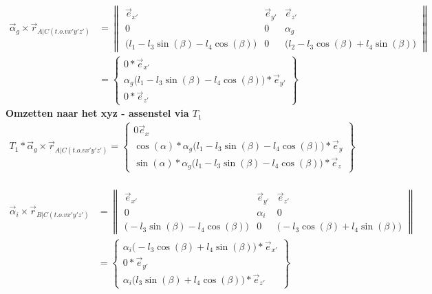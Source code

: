 \documentclass[a4paper,10pt]{article}
\begin{document}
\begin{equation}
	\begin{aligned}
		\vec{\alpha}_g \times \vec{r}_{A|C(t.o.v x'y'z')}  &=  \begin{Vmatrix}
			\vec{e}_{x'}& \vec{e}_{y'} & \vec{e}_{z'}\\
			0 & 0 & \alpha_g \\		
			\Big(l_1 - l_3 \sin(\beta) - l_4 \cos(\beta)\Big) &
			0 & \Big (l_2 - l_3 \cos(\beta) + l_4 \sin(\beta) \Big) 
		\end{Vmatrix}\\
		&= \begin{Bmatrix}
			0*\vec{e}_{x'}\\
			\alpha_g \Big(l_1 - l_3 \sin(\beta) - l_4 \cos(\beta)\Big)*\vec{e}_{y'}\\
			0*\vec{e}_{z'}
		\end{Bmatrix}
	\end{aligned}
\end{equation}
\textbf{Omzetten naar het xyz - assenstel via $T_1$}
\begin{equation}
	\begin{aligned}
		{T}_{1}*\vec{\alpha}_g \times \vec{r}_{A|C(t.o.v x'y'z')} = \begin{Bmatrix}
			{0\vec{e}_{x}}\\
			\cos(\alpha)*	\alpha_g \Big(l_1 - l_3 \sin(\beta) - l_4 \cos(\beta)\Big)*\vec{e}_{y}\\
			\sin(\alpha)*	\alpha_g \Big(l_1 - l_3 \sin(\beta) - l_4 \cos(\beta)\Big)*\vec{e}_{z}
		\end{Bmatrix}
	\end{aligned}
\end{equation}\\
\begin{equation}
	\begin{aligned}
		\vec{\alpha}_i \times \vec{r}_{B|C(t.o.v x'y'z')}  &=  \begin{Vmatrix}
			\vec{e}_{x'}& \vec{e}_{y'} & \vec{e}_{z'}\\
			0 & \alpha_i & 0 \\		
			\Big(- l_3 \sin(\beta) - l_4 \cos(\beta)\Big) &
			0 & \Big (- l_3 \cos(\beta) + l_4 \sin(\beta) \Big) 
		\end{Vmatrix}\\
		&= \begin{Bmatrix}
			\alpha_i \Big(- l_3 \cos(\beta) + l_4 \sin(\beta)\Big)*\vec{e}_{x'}\\
			0*\vec{e}_{y'}\\
			\alpha_i \Big(l_3 \sin(\beta) + l_4 \cos(\beta)\Big)*\vec{e}_{z'}
		\end{Bmatrix}
	\end{aligned}
\end{equation}
\end{document}
